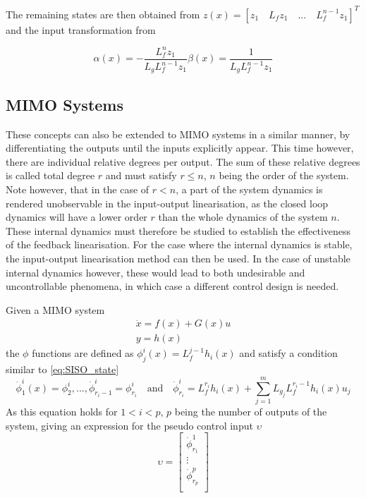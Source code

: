 The remaining states are then obtained from $z(x) = [z_1 \quad L_fz_1 \quad ... \quad L_f^{n-1}z_1]^T$ and the input transformation from

\begin{subequations}
	\begin{equation}
		\alpha (x) = - \dfrac{L_f^nz_1}{L_gL_f^{n-1}z_1}
	\end{equation}
	\begin{equation}
		\beta (x) = \dfrac{1}{L_gL_f^{n-1}z_1}
	\end{equation}
\end{subequations}

\subsection{MIMO Systems}
\label{section:background/MIMO_NLI}

These concepts can also be extended to MIMO systems in a similar manner, by differentiating the outputs until the inputs explicitly appear. This time however, there are individual relative degrees per output. The sum of these relative degrees is called total degree $r$ and must satisfy $r\leq n$, $n$ being the order of the system. Note however, that in the case of $r<n$, a part of the system dynamics is rendered unobservable in the input-output linearisation, as the closed loop dynamics will have a lower order $r$ than the whole dynamics of the system $n$. These internal dynamics must therefore be studied to establish the effectiveness of the feedback linearisation. For the case where the internal dynamics is stable, the input-output linearisation method can then be used. In the case of unstable internal dynamics however, these would lead to both undesirable and uncontrollable phenomena, in which case a different control design is needed.

Given a MIMO system 
\begin{gather}
\dot{x} = f(x) + G(x)u\\
y=h(x)
\end{gather}
the $\phi$ functions are defined as $\phi^i_j(x)=L^{j-1}_fh_i(
x)$ and satisfy a condition similar to \ref{eq:SISO_state} 
\begin{equation}
\dot{\phi}^i_1(x)=\phi^i_2,...,\dot{\phi}^i_{r_i-1}=\phi^i_{r_i} \quad \text{and} \quad \dot{\phi}^i_{r_i}=L_f^{r_i}h_i(x)+\sum^m_{j=1}L_{g_j}L^{r_i-1}_fh_i(x)u_j
\end{equation}
As this equation holds for $1<i<p$, $p$ being the number of outputs of the system, giving an expression for the pseudo control input $\upsilon$
\begin{equation}
\upsilon = 
\begin{bmatrix}
\dot{\phi}^1_{r_1}\\
\vdots\\
\dot{\phi}^p_{r_p}\\
\end{bmatrix}
\end{equation}

